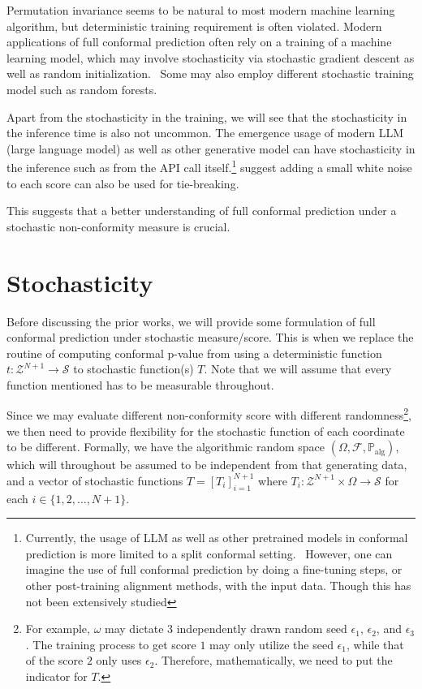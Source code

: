 \documentclass{article}
\newcommand{\oo}[1]{\left( #1 \right)}
\newcommand{\cc}[1]{\left[ #1 \right]}
\begin{document}
    Permutation invariance seems to be natural to most modern machine learning algorithm, but deterministic training requirement is often violated. Modern applications of full conformal prediction often rely on a training of a machine learning model, which may involve stochasticity via stochastic gradient descent as well as random initialization.~\cite{lee2025leaveoneout,tailor2025approximating} Some may also employ different stochastic training model such as random forests.~\citep{linusson2014efficiency,gauraha2018conformalclassification}
    
    Apart from the stochasticity in the training, we will see that the stochasticity in the inference time is also not uncommon.  The emergence usage of modern LLM (large language model) as well as other generative model can have stochasticity in the inference such as from the API call itself.\footnote{Currently, the usage of LLM as well as other pretrained models in conformal prediction is more limited to a split conformal setting.~\citep{ravfogel2023conformal, quach2024conformal,su2024api,epstein2026llms} However, one can imagine the use of full conformal prediction by doing a fine-tuning steps, or other post-training alignment methods, with the input data. Though this has not been extensively studied} \cite{angelopoulos2022gentle} suggest adding a small white noise to each score can also be used for tie-breaking.

    This suggests that a better understanding of full conformal prediction under a stochastic non-conformity measure is crucial. 

\section{Stochasticity}
    
    Before discussing the prior works, we will provide some formulation of full conformal prediction under stochastic measure/score. This is when we replace the routine of computing conformal p-value from using a deterministic function $t: \mathcal{Z}^{N+1} \to \mathcal{S}$ to stochastic function(s) $T$. Note that we will assume that every function mentioned has to be measurable throughout.

    Since we may evaluate different non-conformity score with different randomness\footnote{For example, $\omega$ may dictate $3$ independently drawn random seed $\epsilon_1$, $\epsilon_2$, and $\epsilon_3$. The training process to get score $1$ may only utilize the seed $\epsilon_1$, while that of the score $2$ only uses $\epsilon_2$. Therefore, mathematically, we need to put the indicator for $T$.}, we then need to provide flexibility for the stochastic function of each coordinate to be different. Formally, we have the algorithmic random space $\oo{\Omega, \mathcal{F}, \mathbb{P}_{\text{alg}}}$, which will throughout be assumed to be independent from that generating data, and a vector of stochastic functions $T = \cc{T_i}_{i=1}^{N+1}$ where  $T_i: \mathcal{Z}^{N+1} \times \Omega \to \mathcal{S}$ for each $i \in \{1,2,\dots, N+1\}$. 
    
\end{document}

